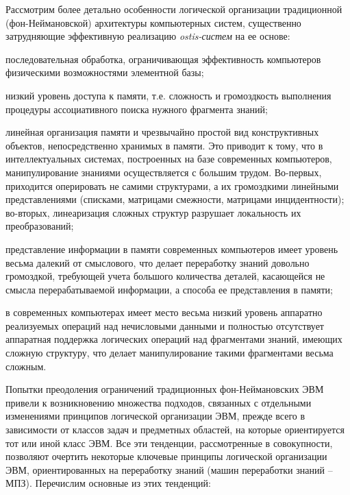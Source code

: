 Рассмотрим более детально особенности логической организации традиционной (фон-Неймановской) архитектуры компьютерных систем, существенно затрудняющие эффективную реализацию \textit{ostis-систем} на ее основе:
\begin{textitemize}
	\item последовательная обработка, ограничивающая эффективность компьютеров физическими возможностями элементной базы;
	\item низкий уровень доступа к памяти, т.е. сложность и громоздкость выполнения процедуры ассоциативного поиска нужного фрагмента знаний; 
	\item линейная организация памяти и чрезвычайно простой вид конструктивных объектов, непосредственно хранимых в памяти. Это приводит к тому, что в интеллектуальных системах, построенных на базе современных компьютеров, манипулирование знаниями осуществляется с большим трудом. Во-первых, приходится оперировать не самими структурами, а их громоздкими линейными представлениями (списками, матрицами смежности, матрицами инцидентности); во-вторых, линеаризация сложных структур разрушает локальность их преобразований;
	\item представление информации в памяти современных компьютеров имеет уровень весьма далекий от смыслового, что делает переработку знаний довольно громоздкой, требующей учета большого количества деталей, касающейся не смысла перерабатываемой информации, а способа ее представления в памяти;
	\item в современных компьютерах имеет место весьма низкий уровень аппаратно реализуемых операций над нечисловыми данными и полностью отсутствует аппаратная поддержка логических операций над фрагментами знаний, имеющих сложную структуру, что делает манипулирование такими фрагментами весьма сложным.
\end{textitemize}

Попытки преодоления ограничений традиционных фон-Неймановских ЭВМ привели к возникновению множества подходов, связанных с отдельными изменениями принципов логической организации ЭВМ, прежде всего в зависимости от классов задач и предметных областей, на которые ориентируется тот или иной класс ЭВМ. Все эти тенденции, рассмотренные в совокупности, позволяют очертить некоторые ключевые принципы логической организации ЭВМ, ориентированных на переработку знаний (машин переработки знаний -- МПЗ). Перечислим основные из этих тенденций:

